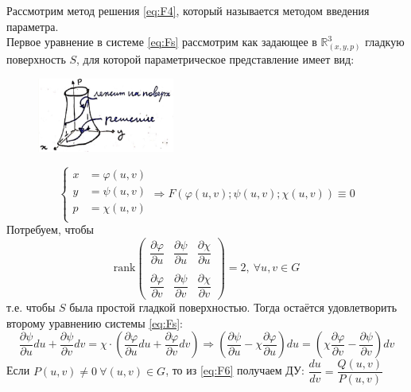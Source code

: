\begin{proposition}
	Рассмотрим метод решения \eqref{eq:F4}, который называется методом введения параметра. \\
	Первое уравнение в системе \eqref{eq:Fs} рассмотрим как задающее в $\mathbb{ R }^3_{(x, y, p)} $ гладкую поверхность $S$, для которой параметрическое представление имеет вид:
	\begin{figure}[!h]
		\centering
		\includegraphics[width = 0.4\textwidth]{image_1.jpeg}
	\end{figure}	
	\[
	\left\{
	\begin{aligned}
		x &= \varphi(u, v)  \\
		y &= \psi(u, v) \\   
		p &= \chi(u, v) \\
	\end{aligned}
	\right.   
	\Rightarrow  F(\varphi(u, v); \psi(u, v); \chi(u, v)) \equiv 0                                                   
	\]
	Потребуем, чтобы
	\[
		\text{rank}
		\begin{pmatrix}
			\dfrac{\partial\varphi}{\partial u} & \dfrac{\partial \psi}{\partial u} & \dfrac{\partial \chi}{\partial u} \\
			\\
			\dfrac{\partial\varphi}{\partial v} & \dfrac{\partial \psi}{\partial v} & \dfrac{\partial \chi}{\partial v}
		\end{pmatrix} = 2, \ \forall u, v \in G 
	\]
	т.е. чтобы $S$ была простой гладкой поверхностью.
	Тогда остаётся удовлетворить второму уравнению системы \eqref{eq:Fs}: \\
	\begin{equation} \label{eq:F6}
		\frac{\partial \psi}{\partial u} du + \frac{\partial \psi}{\partial v} dv = \chi \cdot \left(\frac{\partial \varphi}{\partial u}du + \frac{\partial \varphi}{\partial v}dv\right) \Rightarrow \left( \frac{\partial \psi}{\partial u} - \chi \frac{\partial \varphi}{\partial u} \right) du = \left(\chi \frac{\partial \varphi}{\partial v} - \frac{\partial \psi}{\partial v} \right) dv
	\end{equation}
	Если $ P(u, v) \neq 0 \ \forall (u, v) \in G$, то из \eqref{eq:F6} получаем ДУ: $ \dfrac{du}{dv} = \dfrac{Q(u, v)}{P(u, v)} $

\end{proposition}
